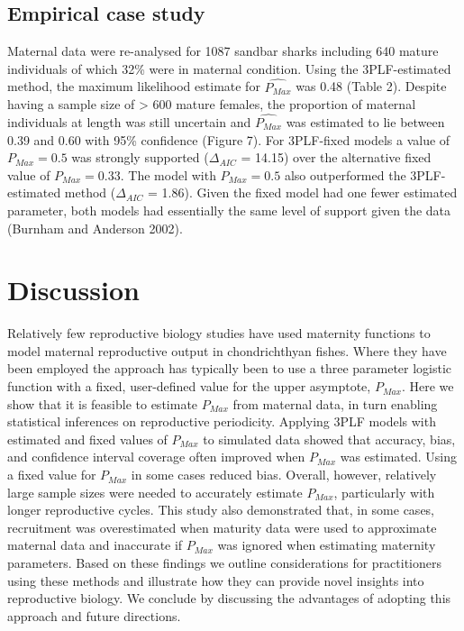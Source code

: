 \documentclass[
]{article}
\begin{document}
\subsection{Empirical case study}\label{empirical-case-study-1}

Maternal data were re-analysed for 1087 sandbar sharks including 640 mature individuals of which 32\% were in maternal condition. Using the 3PLF-estimated method, the maximum likelihood estimate for \(\hat{P_{Max}}\) was 0.48 (Table 2). Despite having a sample size of \textgreater{} 600 mature females, the proportion of maternal individuals at length was still uncertain and \(\hat{P_{Max}}\) was estimated to lie between 0.39 and 0.60 with 95\% confidence (Figure 7). For 3PLF-fixed models a value of \(P_{Max} = 0.5\) was strongly supported (\(\Delta_{AIC}\) = 14.15) over the alternative fixed value of \(P_{Max} = 0.33\). The model with \(P_{Max} = 0.5\) also outperformed the 3PLF-estimated method (\(\Delta_{AIC}\) = 1.86). Given the fixed model had one fewer estimated parameter, both models had essentially the same level of support given the data (Burnham and Anderson 2002).

\section{Discussion}\label{discussion}

Relatively few reproductive biology studies have used maternity functions to model maternal reproductive output in chondrichthyan fishes. Where they have been employed the approach has typically been to use a three parameter logistic function with a fixed, user-defined value for the upper asymptote, \(P_{Max}\). Here we show that it is feasible to estimate \(P_{Max}\) from maternal data, in turn enabling statistical inferences on reproductive periodicity. Applying 3PLF models with estimated and fixed values of \(P_{Max}\) to simulated data showed that accuracy, bias, and confidence interval coverage often improved when \(P_{Max}\) was estimated. Using a fixed value for \(P_{Max}\) in some cases reduced bias. Overall, however, relatively large sample sizes were needed to accurately estimate \(P_{Max}\), particularly with longer reproductive cycles. This study also demonstrated that, in some cases, recruitment was overestimated when maturity data were used to approximate maternal data and inaccurate if \(P_{Max}\) was ignored when estimating maternity parameters. Based on these findings we outline considerations for practitioners using these methods and illustrate how they can provide novel insights into reproductive biology. We conclude by discussing the advantages of adopting this approach and future directions.
\end{document}
